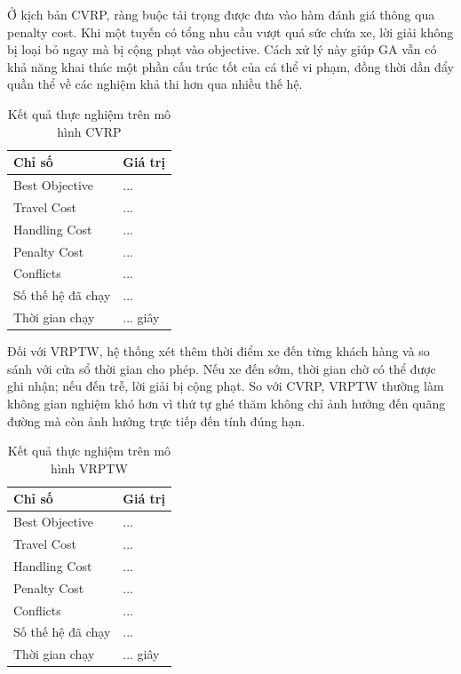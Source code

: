\documentclass[12pt,a4paper]{article}
\numberwithin{figure}{subsection}
\numberwithin{table}{subsection}
\begin{document}
Ở kịch bản CVRP, ràng buộc tải trọng được đưa vào hàm đánh giá thông qua penalty cost. Khi một tuyến có tổng nhu cầu vượt quá sức chứa xe, lời giải không bị loại bỏ ngay mà bị cộng phạt vào objective. Cách xử lý này giúp GA vẫn có khả năng khai thác một phần cấu trúc tốt của cá thể vi phạm, đồng thời dần đẩy quần thể về các nghiệm khả thi hơn qua nhiều thế hệ.

\begin{table}[htbp]
    \centering
    \caption{Kết quả thực nghiệm trên mô hình CVRP}
    \label{tab:cvrp_result}
    \renewcommand{\arraystretch}{1.28}
    \begin{tabular}{|p{6cm}|p{6cm}|}
        \hline
        \textbf{Chỉ số} & \textbf{Giá trị} \\
        \hline
        Best Objective & ... \\
        \hline
        Travel Cost & ... \\
        \hline
        Handling Cost & ... \\
        \hline
        Penalty Cost & ... \\
        \hline
        Conflicts & ... \\
        \hline
        Số thế hệ đã chạy & ... \\
        \hline
        Thời gian chạy & ... giây \\
        \hline
    \end{tabular}
\end{table}

Đối với VRPTW, hệ thống xét thêm thời điểm xe đến từng khách hàng và so sánh với cửa sổ thời gian cho phép. Nếu xe đến sớm, thời gian chờ có thể được ghi nhận; nếu đến trễ, lời giải bị cộng phạt. So với CVRP, VRPTW thường làm không gian nghiệm khó hơn vì thứ tự ghé thăm không chỉ ảnh hưởng đến quãng đường mà còn ảnh hưởng trực tiếp đến tính đúng hạn.

\begin{table}[htbp]
    \centering
    \caption{Kết quả thực nghiệm trên mô hình VRPTW}
    \label{tab:vrptw_result}
    \renewcommand{\arraystretch}{1.28}
    \begin{tabular}{|p{6cm}|p{6cm}|}
        \hline
        \textbf{Chỉ số} & \textbf{Giá trị} \\
        \hline
        Best Objective & ... \\
        \hline
        Travel Cost & ... \\
        \hline
        Handling Cost & ... \\
        \hline
        Penalty Cost & ... \\
        \hline
        Conflicts & ... \\
        \hline
        Số thế hệ đã chạy & ... \\
        \hline
        Thời gian chạy & ... giây \\
        \hline
    \end{tabular}
\end{table}
\end{document}

